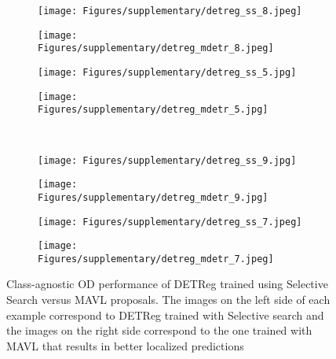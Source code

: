 \documentclass[runningheads]{llncs}
\begin{document}
\begin{figure*}[!h]
  \centering
    \begin{subfigure}{.245\columnwidth}
    \centering
    \texttt{[image: Figures/supplementary/detreg\_ss\_8.jpeg]}
  \end{subfigure}\begin{subfigure}{.245\columnwidth}
    \centering
    \texttt{[image: Figures/supplementary/detreg\_mdetr\_8.jpeg]}
  \end{subfigure}
  \begin{subfigure}{.245\columnwidth}
    \centering
    \texttt{[image: Figures/supplementary/detreg\_ss\_5.jpg]}
  \end{subfigure}\begin{subfigure}{.245\columnwidth}
    \centering
    \texttt{[image: Figures/supplementary/detreg\_mdetr\_5.jpg]}
  \end{subfigure}\\
  \begin{subfigure}{.245\columnwidth}
    \centering
    \texttt{[image: Figures/supplementary/detreg\_ss\_9.jpg]}
  \end{subfigure}\begin{subfigure}{.245\columnwidth}
    \centering
    \texttt{[image: Figures/supplementary/detreg\_mdetr\_9.jpg]}
  \end{subfigure}\begin{subfigure}{.245\columnwidth}
    \centering
    \texttt{[image: Figures/supplementary/detreg\_ss\_7.jpeg]}
  \end{subfigure}\begin{subfigure}{.245\columnwidth}
    \centering
    \texttt{[image: Figures/supplementary/detreg\_mdetr\_7.jpeg]}
  \end{subfigure}\caption{Class-agnostic OD performance of DETReg \cite{detreg} trained using Selective Search \cite{uijlings2013selective} versus MAVL proposals. The images on the left side of each example correspond to DETReg trained with Selective search and the images on the right side correspond to the one trained with MAVL that results in better localized predictions}
  \label{figure:detreg}
\end{figure*}
\end{document}
